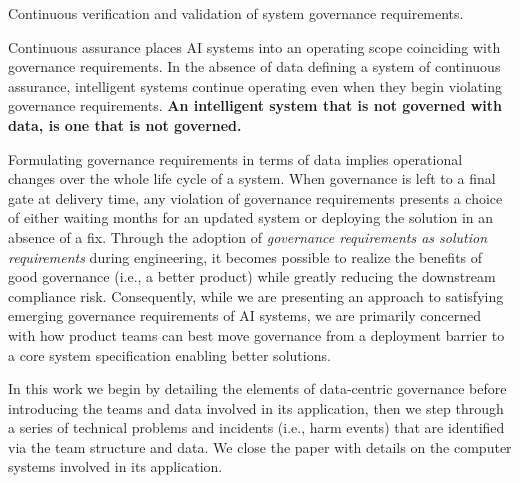 \begin{definition}
    Continuous verification and validation of system governance requirements.
\end{definition}

Continuous assurance places AI systems into an operating scope coinciding with governance requirements. In the absence of data defining a system of continuous assurance, intelligent systems continue operating even when they begin violating governance requirements. \textbf{An intelligent system that is not governed with data, is one that is not governed.}

Formulating governance requirements in terms of data implies operational changes over the whole life cycle of a system. When governance is left to a final gate at delivery time, any violation of governance requirements presents a choice of either waiting months for an updated system or deploying the solution in an absence of a fix. Through the adoption of \textit{governance requirements as solution requirements} during engineering, it becomes possible to realize the benefits of good governance (i.e., a better product) while greatly reducing the downstream compliance risk. Consequently, while we are presenting an approach to satisfying emerging governance requirements of AI systems, we are primarily concerned with how product teams can best move governance from a deployment barrier to a core system specification enabling better solutions.

In this work we begin by detailing the elements of data-centric governance before introducing the teams and data involved in its application, then we step through a series of technical problems and incidents (i.e., harm events) that are identified via the team structure and data. We close the paper with details on the computer systems involved in its application.




